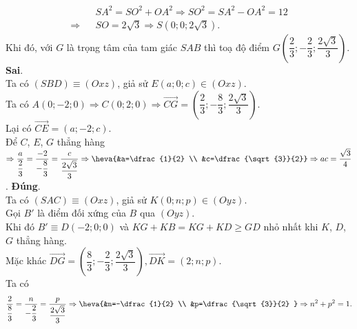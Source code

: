 \begin{ex}
{\begin{itemchoice}
\begin{eqnarray*}
		&&SA^2=SO^2+OA^2\Rightarrow SO^2=SA^2-OA^2=12\\
		\Rightarrow && SO=2\sqrt{3} \Rightarrow S\left(0; 0; 2\sqrt{3}\right).
	\end{eqnarray*}
	Khi đó, với $G$ là trọng tâm của tam giác $SAB$ thì toạ độ điểm $G\left(\dfrac{2}{3};-\dfrac{2}{3}; \dfrac{2\sqrt{3}}{3}\right)$.
	\itemch \textbf{Sai}.\\
	Ta có $(SBD)\equiv (Oxz)$, giả sử $E(a;0;c)\in (Oxz)$.\\
	Ta có $A(0;-2; 0) \Rightarrow C(0; 2; 0) \Rightarrow \overrightarrow{CG}=\left(\dfrac{2}{3};-\dfrac{8}{3}; \dfrac{2\sqrt{3}}{3}\right)$.\\
	Lại có
	$\overrightarrow{CE}=(a;-2;c)$.\\
	Để $C$, $E$, $G$ thẳng hàng $\Rightarrow \dfrac{a}{\dfrac{2}{3}}=\dfrac{-2}{-\dfrac{8}{3}}=\dfrac{c}{\dfrac{2\sqrt{3}}{3}} \Rightarrow\heva{&a=\dfrac{1}{2} \\
		&c=\dfrac{\sqrt{3}}{2}} \Rightarrow ac=\dfrac{\sqrt{3}}{4}$.
	\itemch \textbf{Đúng}.\\
	Ta có $(SAC)\equiv (Oxz)$, giả sử $K(0;n;p)\in (Oyz)$.\\
	Gọi $B'$ là điểm đối xứng của $B$ qua $(Oyz)$. \\
	Khi đó $B' \equiv D(-2;0;0)$ và $KG+KB=KG+KD\geq GD$ nhỏ nhất khi $K$, $D$, $G$ thẳng hàng.\\
	Mặc khác $\overrightarrow{D G}=\left(\dfrac{8}{3};-\dfrac{2}{3}; \dfrac{2 \sqrt{3}}{3}\right), \overrightarrow{DK}=(2;n;p)$.\\
	Ta có
	\allowdisplaybreaks
	\begin{eqnarray*}
		\dfrac{2}{\dfrac{8}{3}}=\dfrac{n}{-\dfrac{2}{3}}=\dfrac{p}{\dfrac{2\sqrt{3}}{3}} \Rightarrow\heva{&n=-\dfrac{1}{2} \\
			&p=\dfrac{\sqrt{3}}{2}
		} \Rightarrow n^2+p^2=1.	
	\end{eqnarray*}
\end{itemchoice}
}		
\end{ex}

